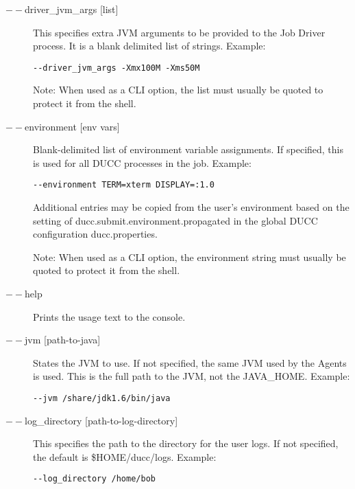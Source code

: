\begin{description}
           \item[$--$driver\_jvm\_args {[list]} ]

             This specifies extra JVM arguments to be provided to the Job Driver process. It is a blank delimited 
             list of strings. Example: 
             \begin{verbatim}
--driver_jvm_args -Xmx100M -Xms50M 
             \end{verbatim}

             Note: When used as a CLI option, the list must usually be
             quoted to protect it from the shell.
             
           \item[$--$environment {[env vars]}] Blank-delimited list of environment variable
             assignments. If specified, this is used for all DUCC processes in the job. Example:
             \begin{verbatim}
--environment TERM=xterm DISPLAY=:1.0
             \end{verbatim}
             
             Additional entries may be copied from the user's environment based on the setting of
             ducc.submit.environment.propagated in the global DUCC configuration ducc.properties.

             Note: When used as a CLI option, the environment string must usually be
             quoted to protect it from the shell.

           \item[$--$help ]

             Prints the usage text to the console. 

           \item[$--$jvm {[path-to-java]}  ]

             States the JVM to use. If not specified, the same JVM used by the Agents is used.  This is
             the full path to the JVM, not the JAVA\_HOME.
             Example: 
\begin{verbatim}
--jvm /share/jdk1.6/bin/java 
\end{verbatim}
             
           \item[$--$log\_directory {[path-to-log-directory]} ]

             This specifies the path to the directory for the user logs. If not specified, the default is
             \$HOME/ducc/logs. Example: 
             \begin{verbatim}
--log_directory /home/bob 
             \end{verbatim}
             

\end{description}
